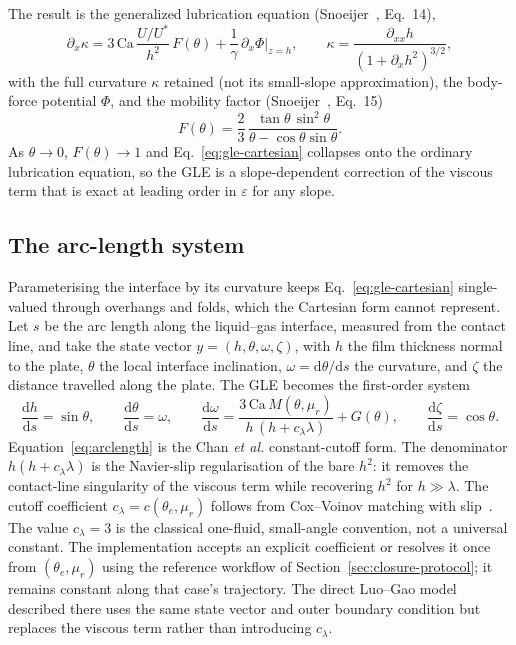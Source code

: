 \documentclass[11pt,a4paper]{article}
\newcommand{\Ca}{\mathrm{Ca}}
\newcommand{\dd}{\mathrm{d}}
\newcommand{\mur}{\mu_r}
\begin{document}
The result is the generalized lubrication equation (Snoeijer~\cite{snoeijer2006},
Eq.~14),
\begin{equation}
  \partial_x \kappa
  = 3\,\Ca\,\frac{U/U^{*}}{h^{2}}\,F(\theta)
    + \frac{1}{\gamma}\,\partial_x \Phi\big|_{z=h},
  \qquad
  \kappa = \frac{\partial_{xx} h}{(1 + \partial_x h^{2})^{3/2}},
  \label{eq:gle-cartesian}
\end{equation}
with the full curvature $\kappa$ retained (not its small-slope
approximation), the body-force potential $\Phi$, and the mobility factor
(Snoeijer~\cite{snoeijer2006}, Eq.~15)
\begin{equation}
  F(\theta) = \frac{2}{3}\,
  \frac{\tan\theta \, \sin^{2}\theta}{\theta - \cos\theta\sin\theta}.
  \label{eq:Ftheta}
\end{equation}
As $\theta \to 0$, $F(\theta) \to 1$ and Eq.~\eqref{eq:gle-cartesian} collapses
onto the ordinary lubrication equation, so the GLE is a slope-dependent
correction of the viscous term that is exact at leading order in $\varepsilon$
for any slope.

\subsection{The arc-length system}

Parameterising the interface by its curvature keeps
Eq.~\eqref{eq:gle-cartesian} single-valued through overhangs and folds, which
the Cartesian form cannot represent. Let $s$ be the arc length along the
liquid--gas interface, measured from the contact line, and take the state
vector $y = (h, \theta, \omega, \zeta)$, with $h$ the film thickness normal to
the plate, $\theta$ the local interface inclination, $\omega = \dd\theta/\dd s$
the curvature, and $\zeta$ the distance travelled along the plate. The GLE
becomes the first-order system
\begin{equation}
  \frac{\dd h}{\dd s} = \sin\theta, \qquad
  \frac{\dd\theta}{\dd s} = \omega, \qquad
  \frac{\dd\omega}{\dd s}
    = \frac{3\,\Ca\,M(\theta,\mur)}
           {h\,(h + c_{\lambda}\lambda)} + G(\theta), \qquad
  \frac{\dd\zeta}{\dd s} = \cos\theta.
  \label{eq:arclength}
\end{equation}
Equation~\eqref{eq:arclength} is the Chan \emph{et al.} constant-cutoff form.
The denominator $h(h+c_{\lambda}\lambda)$ is the Navier-slip regularisation of
the bare $h^{2}$: it removes the contact-line singularity of the viscous term
while recovering $h^{2}$ for $h \gg \lambda$. The cutoff coefficient
$c_{\lambda}=c(\theta_e,\mur)$ follows from Cox--Voinov matching with
slip~\cite{chan2020}. The value $c_{\lambda}=3$ is the classical one-fluid,
small-angle convention, not a universal constant. The implementation accepts
an explicit coefficient or resolves it once from $(\theta_e,\mur)$ using the
reference workflow of Section~\ref{sec:closure-protocol}; it remains constant
along that case's trajectory. The direct Luo--Gao model described there uses
the same state vector and outer boundary condition but replaces the viscous
term rather than introducing $c_{\lambda}$.
\end{document}
